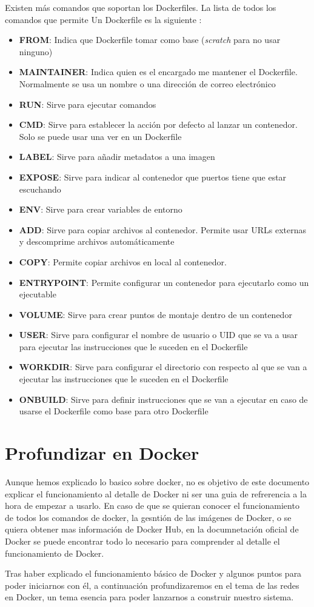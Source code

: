 	Existen más comandos que soportan los Dockerfiles. La lista de todos los comandos que permite Un Dockerfile es la siguiente \cite{dockerfiles-doc}:
	\begin{itemize}
		 \item \textbf{FROM}: Indica que Dockerfile tomar como base (\textit{scratch} para no usar ninguno)
		 \item \textbf{MAINTAINER}: Indica quien es el encargado me mantener el Dockerfile. Normalmente se usa un nombre o una dirección de correo electrónico
		 \item \textbf{RUN}: Sirve para ejecutar comandos
		 \item \textbf{CMD}: Sirve para establecer la acción por defecto al lanzar un contenedor. Solo se puede usar una ver en un Dockerfile
		 \item \textbf{LABEL}: Sirve para añadir metadatos a una imagen
		 \item \textbf{EXPOSE}: Sirve para indicar al contenedor que puertos tiene que estar escuchando
		 \item \textbf{ENV}: Sirve para crear variables de entorno
		 \item \textbf{ADD}: Sirve para copiar archivos al contenedor. Permite usar URLs externas y descomprime archivos automáticamente
		 \item \textbf{COPY}: Permite copiar archivos en local al contenedor.
		 \item \textbf{ENTRYPOINT}: Permite configurar un contenedor para ejecutarlo como un ejecutable 
		 \item \textbf{VOLUME}: Sirve para crear puntos de montaje dentro de un contenedor
		 \item \textbf{USER}: Sirve para configurar el nombre de usuario o UID que se va a usar para ejecutar las instrucciones que le suceden en el Dockerfile
		 \item \textbf{WORKDIR}: Sirve para configurar el directorio con respecto al que se van a ejecutar las instrucciones que le suceden en el Dockerfile
		 \item \textbf{ONBUILD}: Sirve para definir instrucciones que se van a ejecutar en caso de usarse el Dockerfile como base para otro Dockerfile
	\end{itemize}
	
	\section{Profundizar en Docker}
	Aunque hemos explicado lo basico sobre docker, no es objetivo de este documento explicar el funcionamiento al detalle de Docker ni ser una guia de refrerencia a la hora de empezar a usarlo. En caso de que se quieran conocer el funcionamiento de todos los comandos de docker, la gesntión de las imágenes de Docker, o se quiera obtener mas información de Docker Hub, en la documnetación oficial de Docker \cite{docker-docs} se puede encontrar todo lo necesario para comprender al detalle el funcionamiento de Docker.
	
	Tras haber explicado el funcionamiento básico de Docker y algunos puntos para poder iniciarnos con él, a continuación profundizaremos en el tema de las redes en Docker, un tema esencia para poder lanzarnos a construir nuestro sistema.
